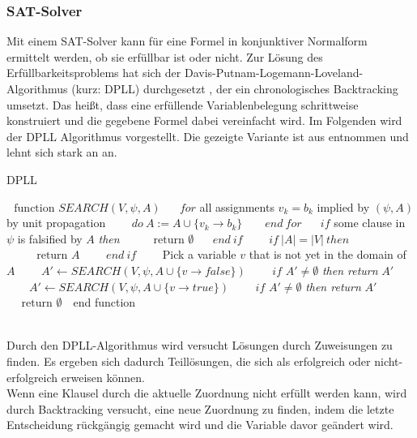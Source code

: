 \documentclass[a4,abstract=on]{scrartcl}
\begin{document}
\subsubsection{SAT-Solver}
Mit einem SAT-Solver kann für eine Formel in konjunktiver Normalform ermittelt werden, ob sie erfüllbar ist oder nicht. Zur Lösung des Erfüllbarkeitsproblems hat sich der Davis-Putnam-Logemann-Loveland-Algorithmus (kurz: DPLL) durchgesetzt \cite[vgl.][]{dpll}, der ein chronologisches Backtracking umsetzt. Das heißt, dass eine erfüllende Variablenbelegung schrittweise konstruiert und die gegebene Formel dabei vereinfacht wird. Im Folgenden wird der DPLL Algorithmus vorgestellt. Die gezeigte Variante ist aus \cite[][]{algoDpll} entnommen und lehnt sich stark an \cite[][]{satisfiability} an.

\FloatBarrier
\begin{algorithm}[h]
\caption{DPLL}
\label{alg:dpll}
\begin{algorithmic}

\State $\text{~~function~}SEARCH(V,\psi,A) $
\State $\text{~~~~}for$ all assignments $v_k=b_k$ implied by $(\psi, A)$ by unit propagation 
\State $\text{~~~~~~}do {~}A:=A\cup\{v_k \rightarrow b_k\}$
\State $\text{~~~~ }end {~} for$
\State $\text{~~~~}if $ some clause in $\psi$ is falsified by $A$ \textit{then}
\State $\text{~~~~~~~~return } \emptyset$
\State $\text{~~~~}end {~} if$
\State $\text{~~~~~~}if {~} |A| = |V| {~} then$
\State $\text{~~~~~~~~return } A$
\State $\text{~~~~~~} end {~} if$
\State $\text{~~~~~~}$Pick a variable $v$ that is not yet in the domain of $A$
\State $\text{~~~~~~} A' \leftarrow SEARCH(V,\psi,A\cup\{v \rightarrow false\})$
\State $\text{~~~~~~}if$ $A' \neq \emptyset$ \textit{then return} $A'$
\State $\text{~~~~~~}A' \leftarrow SEARCH(V,\psi, A \cup \{v \rightarrow true\})$
\State $\text{~~~~~~}if$ $A' \neq \emptyset$ \textit{then return} $A'$
\State $\text{~~~~return }\emptyset$
\State $\text{~~}$end function
\end{algorithmic}
\end{algorithm}
\FloatBarrier
\ \\
Durch den DPLL-Algorithmus wird versucht Lösungen durch Zuweisungen zu finden. Es ergeben sich dadurch Teillösungen, die sich als erfolgreich oder nicht-erfolgreich erweisen können. \\
Wenn eine Klausel durch die aktuelle Zuordnung nicht erfüllt werden kann, wird durch Backtracking versucht, eine neue Zuordnung zu finden, indem die letzte Entscheidung rückgängig gemacht wird und die Variable davor geändert wird. 
\end{document}
